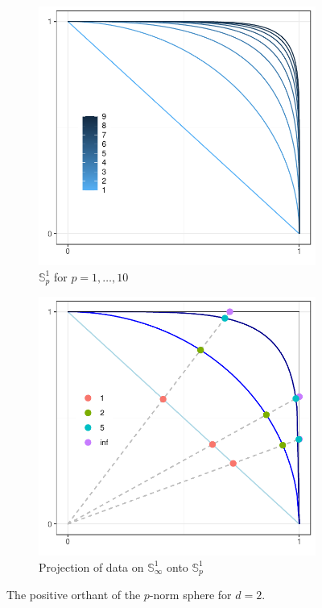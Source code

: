 \begin{figure}[t]
    \centering
  \begin{subfigure}[b]{0.4\textwidth}
    \includegraphics[width=\textwidth]{./images/p_sphere}
    \caption{${\mathbb S}_p^1$ for $p = 1,\ldots, 10$\label{fig:psphere}}
  \end{subfigure}
  \begin{subfigure}[b]{0.4\textwidth}
    \includegraphics[width=\textwidth]{./images/p_project}
    \caption{Projection of data on ${\mathbb S}_{\infty}^1$ onto ${\mathbb S}_p^1$\label{fig:pproject}}
  \end{subfigure}
    \caption{The positive orthant of the $p$-norm sphere for $d=2$.}
\end{figure}

